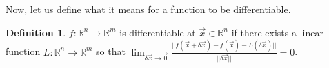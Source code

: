 \documentclass[11pt,leqno,oneside]{amsart}
\newcommand{\R}{{\mathbb R}} %
\theoremstyle{definition}
\newtheorem{defn}[thm]{Definition}
\numberwithin{equation}{section}
\begin{document}
Now, let us define what it means for a function to be differentiable.
\begin{defn}
	$f: \R^n \to \R^m$ is differentiable at $\vec{x} \in \R^n$ if there exists
	a linear function $L: \R^n \to \R^m$ so that $\lim_{\delta \vec{x} \to
	\vec{0}} \frac{||f(\vec{x}+\delta \vec{x}) - f(\vec{x}) - L(\delta
	\vec{x})||}{||\delta \vec{x}||} = 0$.
\end{defn}
\end{document}
